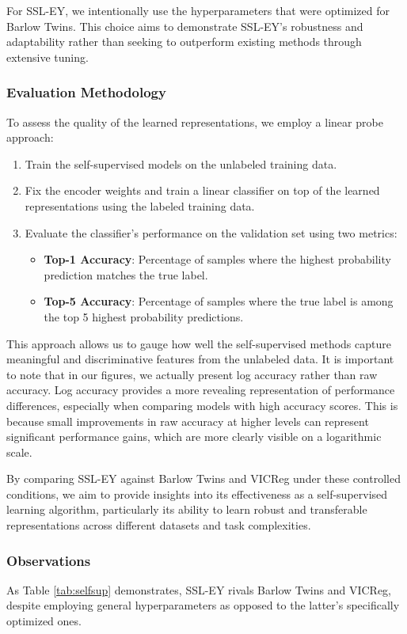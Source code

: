 For SSL-EY, we intentionally use the hyperparameters that were optimized for Barlow Twins. This choice aims to demonstrate SSL-EY's robustness and adaptability rather than seeking to outperform existing methods through extensive tuning.

\subsubsection{Evaluation Methodology}
To assess the quality of the learned representations, we employ a linear probe approach:

\begin{enumerate}
    \item Train the self-supervised models on the unlabeled training data.
    \item Fix the encoder weights and train a linear classifier on top of the learned representations using the labeled training data.
    \item Evaluate the classifier's performance on the validation set using two metrics:
        \begin{itemize}
            \item \textbf{Top-1 Accuracy}: Percentage of samples where the highest probability prediction matches the true label.
            \item \textbf{Top-5 Accuracy}: Percentage of samples where the true label is among the top 5 highest probability predictions.
        \end{itemize}
\end{enumerate}

This approach allows us to gauge how well the self-supervised methods capture meaningful and discriminative features from the unlabeled data.
It is important to note that in our figures, we actually present log accuracy rather than raw accuracy. Log accuracy provides a more revealing representation of performance differences, especially when comparing models with high accuracy scores. This is because small improvements in raw accuracy at higher levels can represent significant performance gains, which are more clearly visible on a logarithmic scale.

By comparing SSL-EY against Barlow Twins and VICReg under these controlled conditions, we aim to provide insights into its effectiveness as a self-supervised learning algorithm, particularly its ability to learn robust and transferable representations across different datasets and task complexities.

\subsubsection{Observations} As Table \ref{tab:selfsup} demonstrates, SSL-EY rivals Barlow Twins and VICReg, despite employing general hyperparameters as opposed to the latter's specifically optimized ones.

